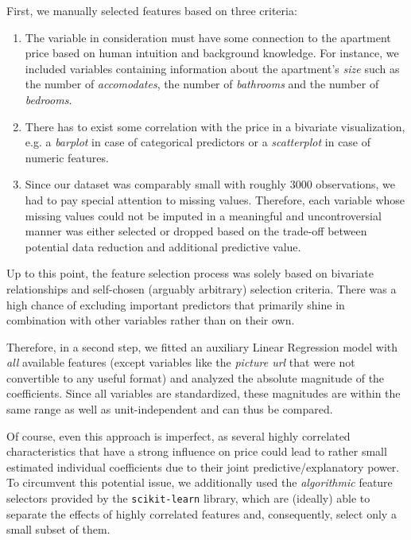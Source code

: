First, we manually selected features based on three criteria:
\begin{enumerate}
  \item The variable in consideration must have some connection to the apartment price based on human intuition and background knowledge.
        For instance, we included variables containing information about the apartment's \emph{size} such as the number of \emph{accomodates}, the number of \emph{bathrooms} and the number of \emph{bedrooms}.
  \item There has to exist some correlation with the price in a bivariate visualization, e.g. a \emph{barplot} in case of categorical predictors or a \emph{scatterplot} in case of numeric features.
  \item Since our dataset was comparably small with roughly $3000$ observations, we had to pay special attention to missing values.
        Therefore, each variable whose missing values could not be imputed in a meaningful and uncontroversial manner was either selected or dropped based on the trade-off between potential data reduction and additional predictive value.
\end{enumerate}

Up to this point, the feature selection process was solely based on bivariate relationships and self-chosen (arguably arbitrary) selection criteria.
There was a high chance of excluding important predictors that primarily shine in combination with other variables rather than on their own.

Therefore, in a second step, we fitted an auxiliary Linear Regression model with \emph{all} available features (except variables like the \emph{picture url} that were not convertible to any useful format) and analyzed the absolute magnitude of the coefficients.
Since all variables are standardized, these magnitudes are within the same range as well as unit-independent and can thus be compared.

Of course, even this approach is imperfect, as several highly correlated characteristics that have a strong influence on price could lead to rather small estimated individual coefficients due to their joint predictive/explanatory power.
To circumvent this potential issue, we additionally used the \emph{algorithmic} feature selectors provided by the \texttt{scikit-learn} library, which are (ideally) able to separate the effects of highly correlated features and, consequently, select only a small subset of them.

